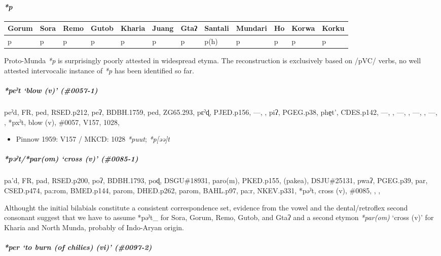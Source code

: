 \documentclass[a4paper,]{article}
\providecommand{\tightlist}{%
  \setlength{\itemsep}{0pt}\setlength{\parskip}{0pt}}
\let\oldparagraph\paragraph
\renewcommand{\paragraph}[1]{\oldparagraph{#1}\mbox{}}
\let\oldsubparagraph\subparagraph
\renewcommand{\subparagraph}[1]{\oldsubparagraph{#1}\mbox{}}
\begin{document}
\paragraph{\texorpdfstring{\emph{*p}}{*p}}\label{p}

\begin{longtable}[]{@{}llllllllllll@{}}
\toprule
Gorum & Sora & Remo & Gutob & Kharia & Juang & Gtaʔ & Santali & Mundari
& Ho & Korwa & Korku\tabularnewline
\midrule
\endhead
p & p & p & p & p & p & p & p(h) & p & p & p & p\tabularnewline
\bottomrule
\end{longtable}

Proto-Munda \emph{*p} is surprisingly poorly attested in widespread
etyma. The reconstruction is exclusively based on /pVC/ verbs, no well
attested intervocalic instance of \emph{*p} has been identified so far.

\subparagraph{\texorpdfstring{\emph{*peˀt} `blow (v)'
(\#0057-1)}{*peˀt blow (v) (\#0057-1)}}\label{peux2c0t-blow-v-0057-1}

peˀd, FR, ped, RSED.p212, peʔ, BDBH.1759, ped, ZG65.293, pɛˀɖ,
PJED.p156, ---, , piʔ, PGEG.p38, phe̠t', CDES.p142, ---, , ---, , ---, ,
---, , *pxˀt, blow (v), \#0057, V157, 1028,

\begin{itemize}
\tightlist
\item
  Pinnow 1959: V157 / MKCD: 1028 \emph{*puut}; \emph{*p{[}əə{]}t}
\end{itemize}

\subparagraph{\texorpdfstring{\emph{*pəˀt}/\emph{*par(om)} `cross (v)'
(\#0085-1)}{*pəˀt/*par(om) cross (v) (\#0085-1)}}\label{pux259ux2c0tparom-cross-v-0085-1}

pa'd, FR, pad, RSED.p200, poʔ, BDBH.1793, poɖ, DSGU\#18931, paro(m),
PKED.p155, (pakea), DSJU\#25131, pwaʔ, PGEG.p39, par, CSED.p474, pa:rom,
BMED.p144, parom, DHED.p262, parom, BAHL.p97, pa:r, NKEV.p331, *pəˀt,
cross (v), \#0085, , ,

Althought the initial bilabials constitute a consistent correspondence
set, evidence from the vowel and the dental/retroflex second consonant
suggest that we have to assume *pəˀt\_ for Sora, Gorum, Remo, Gutob, and
Gtaʔ and a second etymon \emph{*par(om)} `cross (v)' for Kharia and
North Munda, probably of Indo-Aryan origin.

\subparagraph{\texorpdfstring{\emph{*per} `to burn (of chilies) (vi)'
(\#0097-2)}{*per to burn (of chilies) (vi) (\#0097-2)}}\label{per-to-burn-of-chilies-vi-0097-2-1}
\end{document}
